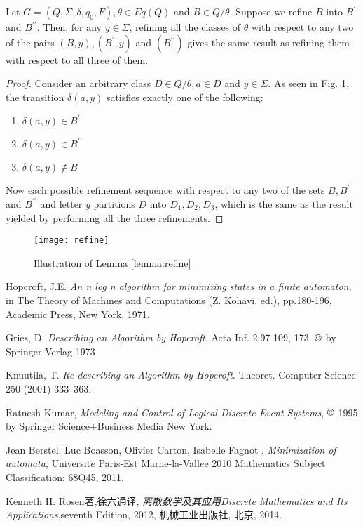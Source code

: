\begin{lemma} \label{lemma:refine}
	Let $G=(Q,\Sigma,\delta,q_0,F),\theta\in Eq(Q)$ and $B\in Q/\theta$. Suppose we refine $B$ into $B^\prime$ and $B^{\prime\prime}$. Then, for any $y\in\Sigma$, refining all the classes of $\theta$ with respect to any two of the pairs $(B,y),(B^\prime,y)$ and $(B^{\prime\prime})$ gives the same result as refining them with respect to all three of them.
\end{lemma}

\begin{proof}
	Consider an arbitrary class $D\in Q/\theta, a\in D$ and $y\in\Sigma$. As seen in Fig. \ref{fig:refine}, the transition $\delta(a,y)$ satisfies exactly one of the following: 
	\begin{enumerate}[(1) ]
		\item $\delta(a,y)\in B^\prime$
		\item $\delta(a,y)\in B^{\prime\prime}$
		\item $\delta(a,y)\notin B$
	\end{enumerate}
	Now each possible refinement sequence with respect to any two of the sets $B,B^\prime$ and $B^{\prime\prime}$ and letter $y$ partitions $D$ into $D_1,D_2,D_3$, which is the same as the result yielded by performing all the three refinements.
\end{proof}

\begin{figure}[htbp]
	\texttt{[image: refine]}
	\caption{Illustration of Lemma \ref{lemma:refine}}
	\label{fig:refine}
\end{figure}

\begin{thebibliography}{99}
	Hopcroft, J.E. \textit{An n log n algorithm for minimizing states in a finite automaton}, in The Theory of Machines and Computations (Z. Kohavi, ed.), pp.180-196, Academic Press, New York, 1971.
	
	Gries, D. \textit{Describing an Algorithm by Hopcroft}, Acta Inf. 2:97 109, 173. $\copyright$ by Springer-Verlag 1973
	
	Knuutila, T. \textit{Re-describing an Algorithm by Hopcroft}. Theoret. Computer Science 250 (2001) 333--363.
		
	Ratnesh Kumar, \textit{Modeling and Control of Logical Discrete Event Systems}, $\copyright$ 1995 by Springer Science+Business Media New York.
	
	Jean Berstel, Luc Boasson, Olivier Carton, Isabelle Fagnot
	, \textit{Minimization of automata}, Universit$\acute{e}$ Paris-Est Marne-la-Vall$\acute{e}$e 2010 Mathematics Subject Classification: 68Q45, 2011.
	
	Kenneth H. Rosen著,徐六通译, \textit{离散数学及其应用Discrete Mathematics and Its Applications},seventh Edition, 2012, 机械工业出版社, 北京, 2014.
	
\end{thebibliography}
